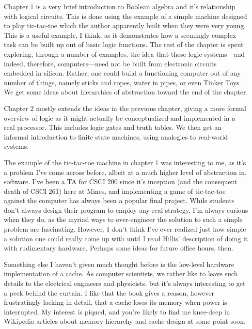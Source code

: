 \documentclass[12pt]{article}
\begin{document}

\pagestyle{fancy}
\fancyhead{} %


Chapter 1 is a very brief introduction to Boolean algebra and it's relationship
with logical circuits. This is done using the example of a simple machine
designed to play tic-tac-toe which the author apparently built when they were
very young. This is a useful example, I think, as it demonstrates how a
seemingly complex task can be built up out of basic logic functions. The rest
of the chapter is spent exploring, through a number of examples, the idea that
these logic systems---and indeed, therefore, computers---need not be built from
electronic circuits embedded in silicon. Rather, one could build a functioning
computer out of any number of things, namely sticks and ropes, water in pipes,
or even Tinker Toys. We get some ideas about hierarchies of abstraction toward
the end of the chapter.

Chapter 2 mostly extends the ideas in the previous chapter, giving a more
formal overview of logic as it might actually be conceptualized and implemented
in a real processor. This includes logic gates and truth tables. We then get an
informal introduction to finite state machines, using analogies to real-world
systems.

\vspace{1em}

The example of the tic-tac-toe machine in chapter 1 was interesting to me, as
it's a problem I've come across before, albeit at a much higher level of
abstraction in, software. I've been a TA for CSCI 200 since it's inception (and
the consequent death of CSCI 261) here at Mines, and implementing a game of
tic-tac-toe against the computer has always been a popular final project. While
students don't always design their program to employ any real strategy, I'm
always curious when they do, as the myriad ways to over-engineer the solution
to such a simple problem are fascinating. However, I don't think I've ever
realized just how simple a solution one could really come up with until I read
Hillis' description of doing it with rudimentary hardware. Perhaps some ideas
for future office hours, then.

Something else I haven't given much thought before is the low-level hardware
implementation of a cache. As computer scientists, we rather like to leave such
details to the electrical engineers and physicists, but it's always interesting
to get a peek behind the curtain. I like that the book gives a reason, however
frustratingly lacking in detail, that a cache loses its memory when power is
interrupted. My interest is piqued, and you're likely to find me knee-deep in
Wikipedia articles about memory hierarchy and cache design at some point soon.
\end{document}
